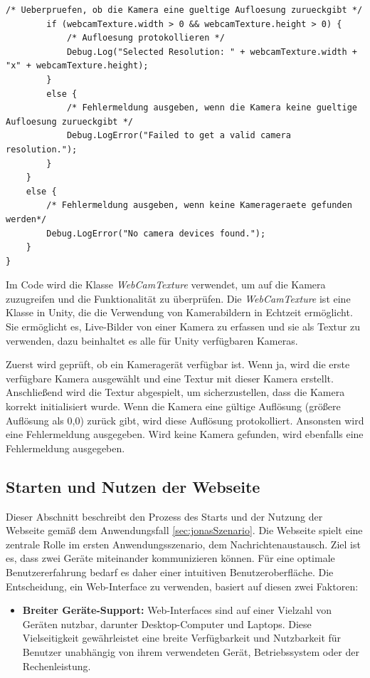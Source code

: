 \begin{itemize}
\begin{lstlisting}[style=csharp, caption={Debug Funktion von der Kamera Benutzung}, label=code:debugRaycast]
        /* Ueberpruefen, ob die Kamera eine gueltige Aufloesung zurueckgibt */
        if (webcamTexture.width > 0 && webcamTexture.height > 0) {
            /* Aufloesung protokollieren */
            Debug.Log("Selected Resolution: " + webcamTexture.width + "x" + webcamTexture.height);
        }
        else {
            /* Fehlermeldung ausgeben, wenn die Kamera keine gueltige Aufloesung zurueckgibt */
            Debug.LogError("Failed to get a valid camera resolution.");
        }
    }
    else {
        /* Fehlermeldung ausgeben, wenn keine Kamerageraete gefunden  werden*/
        Debug.LogError("No camera devices found.");
    }
}
    \end{lstlisting}
    Im Code wird die Klasse \textit{WebCamTexture} verwendet, um auf die Kamera zuzugreifen und die Funktionalität zu überprüfen. Die \textit{WebCamTexture} ist eine Klasse in Unity, die die Verwendung von Kamerabildern in Echtzeit ermöglicht. Sie ermöglicht es, Live-Bilder von einer Kamera zu erfassen und sie als Textur zu verwenden, dazu beinhaltet es alle für Unity verfügbaren Kameras.

    Zuerst wird geprüft, ob ein Kameragerät verfügbar ist. Wenn ja, wird die erste verfügbare Kamera ausgewählt und eine Textur mit dieser Kamera erstellt. Anschließend wird die Textur abgespielt, um sicherzustellen, dass die Kamera korrekt initialisiert wurde. Wenn die Kamera eine gültige Auflösung (größere Auflösung als 0,0) zurück gibt, wird diese Auflösung protokolliert. Ansonsten wird eine Fehlermeldung ausgegeben. Wird keine Kamera gefunden, wird ebenfalls eine Fehlermeldung ausgegeben.


\subsection{Starten und Nutzen der Webseite}
Dieser Abschnitt beschreibt den Prozess des Starts und der Nutzung der Webseite gemäß dem Anwendungsfall \ref{sec:jonasSzenario}. Die Webseite spielt eine zentrale Rolle im ersten Anwendungsszenario, dem Nachrichtenaustausch. Ziel ist es, dass zwei Geräte miteinander kommunizieren können. Für eine optimale Benutzererfahrung bedarf es daher einer intuitiven Benutzeroberfläche. Die Entscheidung, ein Web-Interface zu verwenden, basiert auf diesen zwei Faktoren:

\begin{itemize}
    \item \textbf{Breiter Geräte-Support:} Web-Interfaces sind auf einer Vielzahl von Geräten nutzbar, darunter Desktop-Computer und Laptops. Diese Vielseitigkeit gewährleistet eine breite Verfügbarkeit und Nutzbarkeit für Benutzer unabhängig von ihrem verwendeten Gerät, Betriebssystem oder der Rechenleistung.


\end{itemize}
\end{itemize}
